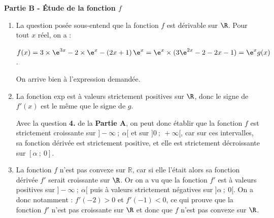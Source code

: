 \textbf{Partie B - Étude de la fonction $f$}

\medskip

\begin{enumerate}
	\item La question posée sous-entend que la fonction $f$ est dérivable sur $\R$. Pour tout $x$ réel, on a :

$f(x) = 3\times \e^{3x} - 2\times \e^x - \left(2x + 1\right)\e^{x} = \e^{x} \times (3\e^{2x} - 2 - 2x-1) = \e^{x}g(x)$.

On arrive bien à l'expression demandée.

	\item La fonction exp est à valeurs strictement positives sur $\R$, donc le signe de $f'(x)$ est le même que le signe de $g$.

Avec la question \textbf{4.} de la \textbf{Partie A}, on peut donc établir que la fonction $f$ est strictement croissante sur $]-\infty~;~\alpha[$ et sur $]0~;~+\infty[$, car sur ces intervalles, sa fonction dérivée est strictement positive, et elle est strictement décroissante sur $[\alpha~;~0]$.

	\item La fonction $f$ n'est pas convexe sur $\mathbb{R}$, car si elle l'était alors sa fonction dérivée $f'$ serait croissante sur $\R$. Or on a vu que la fonction $f'$ est à valeurs positives sur $]-\infty~;~\alpha[$ puis à valeurs strictement négatives sur $]\alpha~;~0[$. On a donc notamment : $f'(-2)>0$ et $f'(-1)< 0$, ce qui prouve que la fonction $f'$ n'est pas croissante sur $\R$ et donc que $f$ n'est pas convexe sur $\R$.
\end{enumerate}

\bigskip
